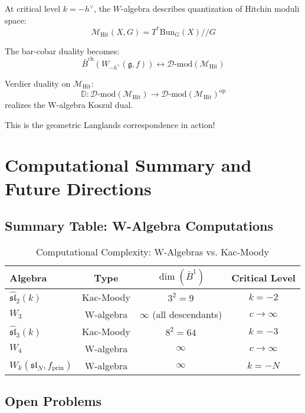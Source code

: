 \begin{remark}
At critical level $k = -h^\vee$, the $W$-algebra describes quantization of Hitchin moduli space:
$$\mathcal{M}_{\text{Hit}}(X, G) = T^*\text{Bun}_G(X) // G$$

The bar-cobar duality becomes:
$$\bar{B}^{\text{ch}}(W_{-h^\vee}(\mathfrak{g}, f)) \leftrightarrow \mathcal{D}\text{-mod}(\mathcal{M}_{\text{Hit}})$$

Verdier duality on $\mathcal{M}_{\text{Hit}}$:
$$\mathbb{D}: \mathcal{D}\text{-mod}(\mathcal{M}_{\text{Hit}}) \to \mathcal{D}\text{-mod}(\mathcal{M}_{\text{Hit}})^{\text{op}}$$
realizes the W-algebra Koszul dual.

This is the geometric Langlands correspondence in action!
\end{remark}

\section{Computational Summary and Future Directions}

\subsection{Summary Table: W-Algebra Computations}

\begin{table}[h]
\centering
\caption{Computational Complexity: W-Algebras vs. Kac-Moody}
\begin{tabular}{|l|c|c|c|}
\hline
\textbf{Algebra} & \textbf{Type} & $\dim(\bar{B}^1)$ & \textbf{Critical Level} \\
\hline
$\widehat{\mathfrak{sl}}_2(k)$ & Kac-Moody & $3^2 = 9$ & $k = -2$ \\
$W_3$ & W-algebra & $\infty$ (all descendants) & $c \to \infty$ \\
$\widehat{\mathfrak{sl}}_3(k)$ & Kac-Moody & $8^2 = 64$ & $k = -3$ \\
$W_4$ & W-algebra & $\infty$ & $c \to \infty$ \\
$W_k(\mathfrak{sl}_N, f_{\text{prin}})$ & W-algebra & $\infty$ & $k = -N$ \\
\hline
\end{tabular}
\end{table}

\subsection{Open Problems}

